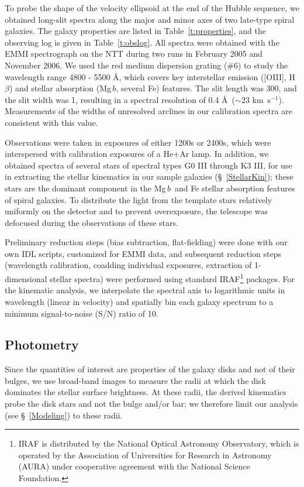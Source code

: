 \documentclass[useAMS,usenatbib]{mn2e}
\newcommand{\kms}{km~s$^{-1}$}
\newcommand{\hb}{H$\beta$}				%
\newcommand{\mgb}{Mg$\,b$}				%
\newcommand{\oiii}{[O{\small III}]}			%
\begin{document}
To probe the shape of the velocity ellipsoid at the end of the Hubble
sequence, we obtained long-slit spectra along the major and minor axes
of two late-type spiral galaxies.  The galaxy properties are listed in
Table~\ref{t:properties}, and the observing log is given in
Table~\ref{t:obslog}.  All spectra were obtained with the EMMI
spectrograph on the NTT during two runs in February 2005 and November
2006.  We used the red medium dispersion grating (\#6) to study the
wavelength range 4800 - 5500 \AA, which covers key interstellar emission
(\oiii, \hb) and stellar absorption (\mgb, several Fe) features.  The
slit length was 300\arcsec, and the slit width was 1\arcsec, resulting
in a spectral resolution of 0.4 \AA\ ($\sim 23$ \kms). Measurements of
the widths of unresolved arclines in our calibration spectra are
consistent with this value.


Observations were taken in exposures of either 1200s or 2400s, which
were interspersed with calibration exposures of a He+Ar lamp.  In
addition, we obtained spectra of several stars of spectral types G0 III
through K3 III, for use in extracting the stellar kinematics in our
sample galaxies (\S~\ref{StellarKin}); these stars are the dominant
component in the \mgb\ and Fe stellar absorption features of spiral
galaxies.  To distribute the light from the template stars relatively
uniformly on the detector and to prevent overexposure, the telescope was
defocused during the observations of these stars.

Preliminary reduction steps (bias subtraction, flat-fielding) were done
with our own IDL scripts, customized for EMMI data, and subsequent
reduction steps (wavelength calibration, coadding individual exposures,
extraction of 1-dimensional stellar spectra) were performed using
standard IRAF\footnote{IRAF is distributed by the National Optical
  Astronomy Observatory, which is operated by the Association of
  Universities for Research in Astronomy (AURA) under cooperative
  agreement with the National Science Foundation.}  packages.
%
For the kinematic analysis, we interpolate the spectral axis to
logarithmic units in wavelength (linear in velocity) and spatially bin
each galaxy spectrum to a minimum signal-to-noise (S/N) ratio of 10.


\subsection{Photometry}
\label{s:phot}

Since the quantities of interest are properties of the galaxy disks and
not of their bulges, we use broad-band images to measure the radii at
which the disk dominates the stellar surface brightness.  At these
radii, the derived kinematics probe the disk stars and not the bulge
and/or bar; we therefore limit our analysis (see \S~\ref{Modeling}) to
these radii.
\end{document}
